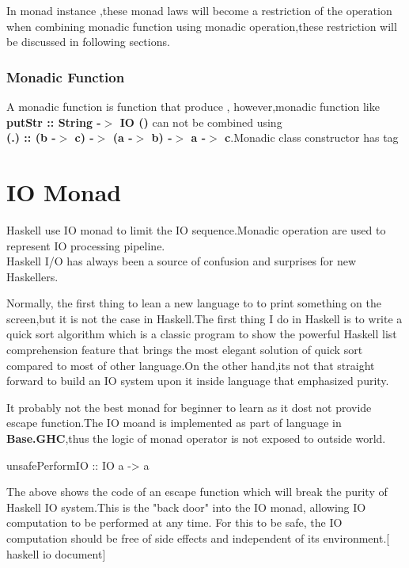 In monad instance ,these monad laws will become a restriction of the operation when combining monadic function using monadic operation,these restriction will be discussed in following sections.


\subsubsection{Monadic Function}
A monadic function is function that produce , however,monadic function like \textbf{putStr :: String -$>$ IO ()} can not be combined using \\ \textbf{(.) :: (b -$>$ c) -$>$ (a -$>$ b) -$>$ a -$>$ c}.Monadic class constructor has tag 



\section{IO Monad}
Haskell use IO monad to limit the IO sequence.Monadic operation are used to represent IO processing pipeline.\\

Haskell I/O has always been a source of confusion and surprises for new Haskellers.

Normally, the first thing to lean a new language to to print something on the screen,but it is not the case in Haskell.The first thing I do in Haskell is to write a quick sort algorithm which is a classic program to show the powerful Haskell list comprehension feature that brings the most elegant solution of quick sort compared to most of other language.On the other hand,its not that straight forward to build an IO system upon it inside language that emphasized purity.



It probably not the best monad for beginner to learn as it dost not provide escape function.The IO moand is implemented as part of language in \textbf{Base.GHC},thus the logic of monad operator is not exposed to outside world.

\begin{hcode}
unsafePerformIO :: IO a -> a
\end{hcode}

The above shows the code of an escape function which will break the purity of Haskell IO system.This is the "back door" into the IO monad, allowing IO computation to be performed at any time. For this to be safe, the IO computation should be free of side effects and independent of its environment.[ haskell io document]


